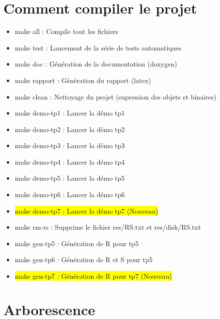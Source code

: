 \documentclass[a4paper]{article}
\begin{document}
\newpage

\section{Comment compiler le projet}

\begin{itemize}
	\item make all : Compile tout les fichiers
	\item make test : Lancement de la série de tests automatiques
	\item make doc  : Génération de la documentation (doxygen)
	\item make rapport : Génération du rapport (latex)
	\item make clean : Nettoyage du projet (supression des objets et binaires)
	\item make demo-tp1 : Lancer la démo tp1
	\item make demo-tp2 : Lancer la démo tp2
	\item make demo-tp3 : Lancer la démo tp3
	\item make demo-tp4 : Lancer la démo tp4
	\item make demo-tp5 : Lancer la démo tp5
  \item make demo-tp6 : Lancer la démo tp6
  \item \colorbox{yellow}{make demo-tp7 : Lancer la démo tp7 (Nouveau)}
	\item make rm-rs : Supprime le fichier res/RS.txt et res/disk/RS.txt
  \item make gen-tp5 : Génération de R pour tp5
  \item make gen-tp6 : Génération de R et S pour tp5
  \item \colorbox{yellow}{make gen-tp7 : Génération de R pour tp7 (Nouveau)}
\end{itemize}

\section{Arborescence}
\end{document}
